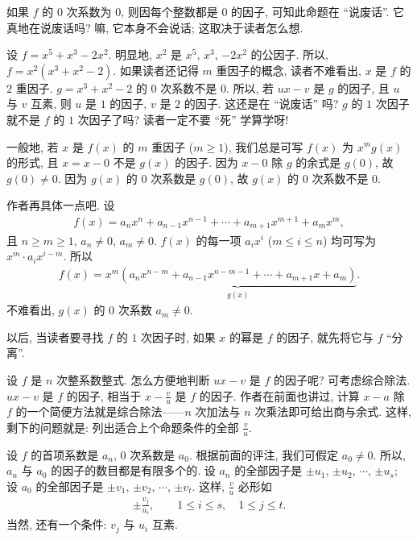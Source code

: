 \begin{remark}
    如果 $f$ 的 $0$ 次系数为 $0$, 则因每个整数都是 $0$ 的因子, 可知此命题在 ``说废话''. 它真地在说废话吗? 嘛, 它本身不会说话; 这取决于读者怎么想.

    设 $f = x^5 + x^3 - 2x^2$. 明显地, $x^2$ 是 $x^5$, $x^3$, $-2x^2$ 的公因子. 所以, $f = x^2 (x^3 + x^2 - 2)$. 如果读者还记得 $m$ 重因子的概念, 读者不难看出, $x$ 是 $f$ 的 $2$ 重因子. $g = x^3 + x^2 - 2$ 的 $0$ 次系数不是 $0$. 所以, 若 $ux - v$ 是 $g$ 的因子, 且 $u$ 与 $v$ 互素, 则 $u$ 是 $1$ 的因子, $v$ 是 $2$ 的因子. 这还是在 ``说废话'' 吗? $g$ 的 $1$ 次因子就不是 $f$ 的 $1$ 次因子了吗? 读者一定不要 ``死'' 学算学呀!

    一般地, 若 $x$ 是 $f(x)$ 的 $m$ 重因子 ($m \geq 1$), 我们总是可写 $f(x)$ 为 $x^m g(x)$ 的形式, 且 $x = x - 0$ 不是 $g(x)$ 的因子. 因为 $x - 0$ 除 $g$ 的余式是 $g(0)$, 故 $g(0) \neq 0$. 因为 $g(x)$ 的 $0$ 次系数是 $g(0)$, 故 $g(x)$ 的 $0$ 次系数不是 $0$.

    作者再具体一点吧. 设
    \begin{align*}
        f(x) = a_n x^n + a_{n-1} x^{n-1} + \cdots + a_{m+1} x^{m+1} + a_m x^m,
    \end{align*}
    且 $n \geq m \geq 1$, $a_n \neq 0$, $a_m \neq 0$. $f(x)$ 的每一项 $a_i x^i$ ($m \leq i \leq n$) 均可写为 $x^m \cdot a_i x^{i-m}$. 所以
    \begin{align*}
        f(x) = x^m \underbrace{(a_n x^{n-m} + a_{n-1} x^{n-m-1} + \cdots + a_{m+1} x + a_m)}_{g(x)}.
    \end{align*}
    不难看出, $g(x)$ 的 $0$ 次系数 $a_m \neq 0$.

    以后, 当读者要寻找 $f$ 的 $1$ 次因子时, 如果 $x$ 的幂是 $f$ 的因子, 就先将它与 $f$ ``分离''.
\end{remark}

设 $f$ 是 $n$ 次整系数整式. 怎么方便地判断 $ux - v$ 是 $f$ 的因子呢? 可考虑综合除法. $ux - v$ 是 $f$ 的因子, 相当于 $x - \frac{v}{u}$ 是 $f$ 的因子. 作者在前面也讲过, 计算 $x - a$ 除 $f$ 的一个简便方法就是综合除法——$n$ 次加法与 $n$ 次乘法即可给出商与余式. 这样, 剩下的问题就是: 列出适合上个命题条件的全部 $\frac{v}{u}$.

设 $f$ 的首项系数是 $a_n$, $0$ 次系数是 $a_0$. 根据前面的评注, 我们可假定 $a_0 \neq 0$. 所以, $a_n$ 与 $a_0$ 的因子的数目都是有限多个的. 设 $a_n$ 的全部因子是 $\pm u_1$, $\pm u_2$, $\cdots$, $\pm u_s$; 设 $a_0$ 的全部因子是 $\pm v_1$, $\pm v_2$, $\cdots$, $\pm v_t$. 这样, $\frac{v}{u}$ 必形如
\begin{align*}
    \pm \frac{v_j}{u_i}, \qquad 1 \leq i \leq s, \quad 1 \leq j \leq t.
\end{align*}
当然, 还有一个条件: $v_j$ 与 $u_i$ 互素.

